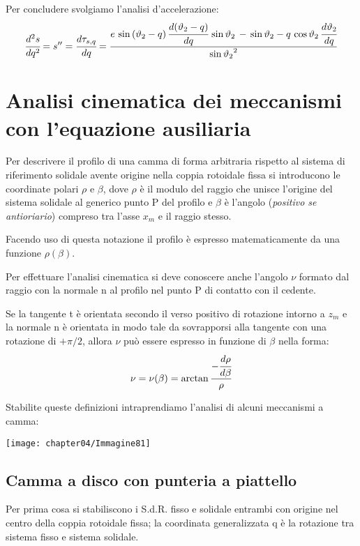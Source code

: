		Per concludere svolgiamo l'analisi d'accelerazione:
		\begin{equation*}
		\cfrac{d^2s}{dq^2} = s'' = \cfrac{d\tau_{s,q}}{dq} =  \frac{e\,\sin{(\vartheta_2 - q)}\,\cfrac{d(\vartheta_2-q)}{dq}\,\sin{\vartheta_2}\,-\,\sin{\vartheta_2-q}\,\cos{\vartheta_2}\,\cfrac{d\vartheta_2}{dq}}{\sin{\vartheta_2}^2}
		\end{equation*}
		
		\section{Analisi cinematica dei meccanismi con l'equazione ausiliaria}
		
		Per descrivere il profilo di una camma di forma arbitraria rispetto al sistema di riferimento solidale avente origine nella coppia rotoidale fissa si introducono le coordinate polari $\rho$ e $\beta$, dove $\rho$ è il modulo del raggio che unisce l'origine del sistema solidale al generico punto P del profilo e $\beta$ è l'angolo (\emph{positivo se antioriario}) compreso tra l'asse $x_m$ e il raggio stesso.
		
		Facendo uso di questa notazione il profilo è espresso matematicamente da una funzione $\rho(\beta)$.
		
		\begin{minipage}{.65\textwidth}
		Per effettuare l'analisi cinematica si deve conoscere anche l'angolo $\nu$ formato dal raggio con la normale n al profilo nel punto P di contatto con il cedente.
		
		Se la tangente t è orientata secondo il verso positivo di rotazione intorno a $z_m$ e la normale n è orientata in modo tale da sovrapporsi alla tangente con una rotazione di $+\pi/2$, allora $\nu$ può essere espresso in funzione di $\beta$ nella forma:
		\[
		\nu = \nu(\beta) = \arctan{\frac{-\cfrac{d\rho}{d\beta}}{\rho}}
		\]
		
		Stabilite queste definizioni intraprendiamo l'analisi di alcuni meccanismi a camma:
		\end{minipage}
		\hfill
		\begin{minipage}{.35\textwidth}
		\centering
		\texttt{[image: chapter04/Immagine81]}
		\end{minipage}
		
		\subsection{Camma a disco con punteria a piattello}
		
		Per prima cosa si stabiliscono i S.d.R. fisso e solidale entrambi con origine nel centro della coppia rotoidale fissa; la coordinata generalizzata q è la rotazione tra sistema fisso e sistema solidale.
		
